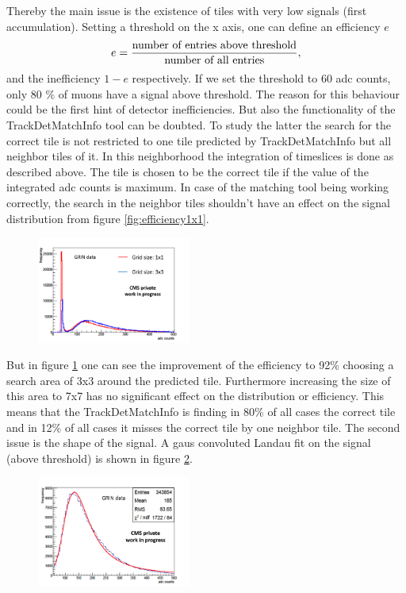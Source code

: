 			Thereby the main issue is the existence of tiles with very low signals (first accumulation).
			Setting a threshold on the x axis, one can define an efficiency $e$
			\begin{equation}
				e = \frac{\textnormal{number of entries above threshold}}{\textnormal{number of all entries}},
			\end{equation}
			and the inefficiency $1-e$ respectively.
			If we set the threshold to 60 adc counts, only 80 \% of muons have a signal above threshold.
			The reason for this behaviour could be the first hint of detector inefficiencies.
			But also the functionality of the TrackDetMatchInfo tool can be doubted.
			To study the latter the search for the correct tile is not restricted to one tile predicted by TrackDetMatchInfo but all neighbor tiles of it.
			In this neighborhood the integration of timeslices is done as described above.
			The tile is chosen to be the correct tile if the value of the integrated adc counts is maximum.
			In case of the matching tool being working correctly, the search in the neighbor tiles shouldn't have an effect on the signal distribution from figure \ref{fig:efficiency1x1}.
			\begin{figure}[htbp]
				\centering
				\includegraphics[width=0.45\textwidth]{Figures/erdogan/neighborhood.png}
				\caption{}
				\label{fig:neighborhood}
			\end{figure}
			But in figure \ref{fig:neighborhood} one can see the improvement of the efficiency to 92\% choosing a search area of 3x3 around the predicted tile.
			Furthermore increasing the size of this area to 7x7 has no significant effect on the distribution or efficiency.
			This means that the TrackDetMatchInfo is finding in 80\% of all cases the correct tile and in 12\% of all cases it misses the correct tile by one neighbor tile.
			The second issue is the shape of the signal.
			A gaus convoluted Landau fit on the signal (above threshold) is shown in figure \ref{fig:langaus_bad}.
			\begin{figure}[htbp]
				\centering
				\includegraphics[width=0.45\textwidth]{Figures/erdogan/langaus_bad.png}
				\caption{}
				\label{fig:langaus_bad}
			\end{figure}
